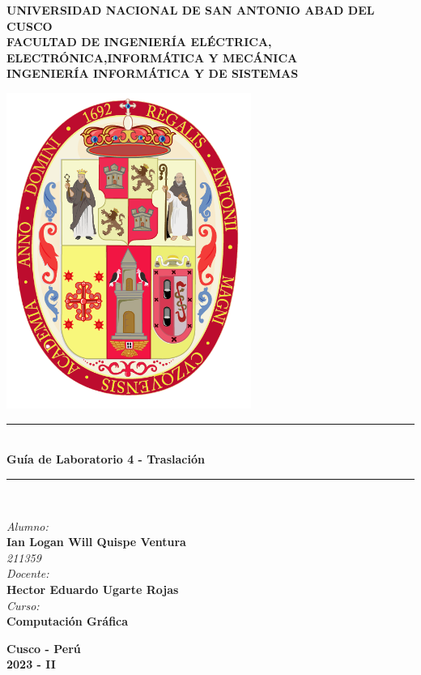 \documentclass[a4paper]{article}
\begin{document}
\begin{titlepage}

\newcommand{\linea}{\rule{\linewidth}{0.7mm}} 
\center
\textbf{\Large UNIVERSIDAD NACIONAL DE SAN ANTONIO ABAD DEL CUSCO}\\[0.2cm]
\textbf{\Large FACULTAD DE INGENIERÍA ELÉCTRICA, ELECTRÓNICA,INFORMÁTICA Y MECÁNICA}\\[0.2cm]
\textbf{\Large INGENIERÍA INFORMÁTICA Y DE SISTEMAS\\[0.6cm]}

\includegraphics[width=8cm]{src/escudo-unsaac.png}
\vfill

\linea
\\[0.3cm]
\textbf{\LARGE Guía de Laboratorio 4 - Traslación}\\[0.2cm]
\linea \\
\vfill

\textit{\Large Alumno:}\\
    \textbf{\large Ian Logan Will Quispe Ventura}\\
    \textit{211359}\\

\vspace{0.3cm}
    \textit{\Large Docente:}\\
    \textbf{\large Hector Eduardo Ugarte Rojas}\\
\vspace{0.5cm}
    \textit{\Large Curso:}\\
    \textbf{\large Computación Gráfica}\\
    \vfill

\vspace{0.4cm}
    \textbf{\Large Cusco - Perú }\\
    \textbf{\large 2023 - II }\\
    \newpage
    \end{titlepage}
\end{document}
